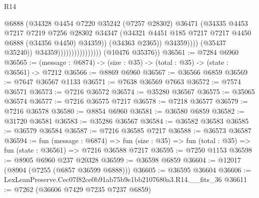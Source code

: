 \begin{lexlean}{R14}
\begin{coremodule}
                                                @6888
                                                (@34328
                                                  @4454
                                                  @7220
                                                  @35242
                                                  (@7257 @28302)
                                                  @36471
                                                  (@34335
                                                    @4453
                                                    @7217
                                                    @7219
                                                    @7256
                                                    @28302
                                                    @34347
                                                    (@34321
                                                      @4451
                                                      @185
                                                      @7217
                                                      @7217
                                                      @4450
                                                      @6888
                                                      (@34356 @4450)
                                                      @34359))
                                                  (@34363 @2365))
                                                @34359))))
                                        (@35437 @35240))
                                      @34359))))))))))))))))
      (@10476 @35376))
@36561 := @7284 @6960
@36565 := (message : @6874) -> (size : @35) -> (total : @35) -> (state : @36561) -> @7212
@36566 := @8869 @6960
@36567 := @36566 @6859
@36569 := @7647 @36567 @1133
@36571 := @7638 @36569 @7663
@36572 := @7574 @36571
@36573 := @7216 @36572
@36574 := @35280 @36567
@36575 := @35065 @36574
@36577 := @7216 @36575 @7217
@36578 := @7218 @36577
@36579 := @7216 @36578
@36580 := @8854 @6960
@36581 := @36580 @6859
@36582 := @31720 @36581
@36583 := @35286 @36567
@36584 := @36582 @36583
@36585 := @36579 @36584
@36587 := @7216 @36585 @7217
@36588 := @36573 @36587
@36594 := fun (message : @6874) =>
  fun (size : @35) => fun (total : @35) => fun (state : @36561) => @7216 @36588 @7217
@36595 := @7250 @1153
@36598 := @8905 @6960 @237 @20328
@36599 := @36598 @6859
@36604 := @12017 (@8904 (@7255 (@6857 @36599 @6888)))
@36605 := @36595 @36604
@36606 := LexLeanPreserve.Cec07f82ce0b91ab75b9e1bb2107680a3.R14.__fits_36
@36611 := @7262 (@36606 @7429 @7235 @7237 @6859)

\end{coremodule}
\end{lexlean}
